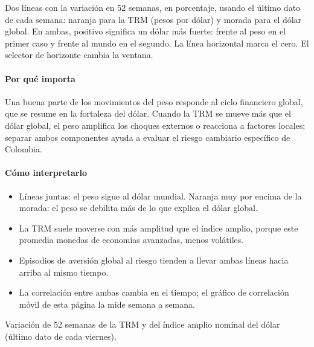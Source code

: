 \begin{leer}
Dos líneas con la variación en 52 semanas, en porcentaje, usando el último dato de cada semana: naranja para la TRM (pesos por dólar) y morada para el dólar global. En ambas, positivo significa un dólar más fuerte: frente al peso en el primer caso y frente al mundo en el segundo. La línea horizontal marca el cero. El selector de horizonte cambia la ventana.
\end{leer}

\paragraph{Por qué importa}
Una buena parte de los movimientos del peso responde al ciclo financiero global, que se resume en la fortaleza del dólar. Cuando la TRM se mueve más que el dólar global, el peso amplifica los choques externos o reacciona a factores locales; separar ambos componentes ayuda a evaluar el riesgo cambiario específico de Colombia.

\paragraph{Cómo interpretarlo}
\begin{itemize}
\item Líneas juntas: el peso sigue al dólar mundial. Naranja muy por encima de la morada: el peso se debilita más de lo que explica el dólar global.
\item La TRM suele moverse con más amplitud que el índice amplio, porque este promedia monedas de economías avanzadas, menos volátiles.
\item Episodios de aversión global al riesgo tienden a llevar ambas líneas hacia arriba al mismo tiempo.
\item La correlación entre ambas cambia en el tiempo; el gráfico de correlación móvil de esta página la mide semana a semana.
\end{itemize}
\begin{formulas}[Fórmulas]
\end{formulas}
\begin{metodo}[Metodología]
Variación de 52 semanas de la TRM y del índice amplio nominal del dólar (último dato de cada viernes).
\par{}
\end{metodo}


